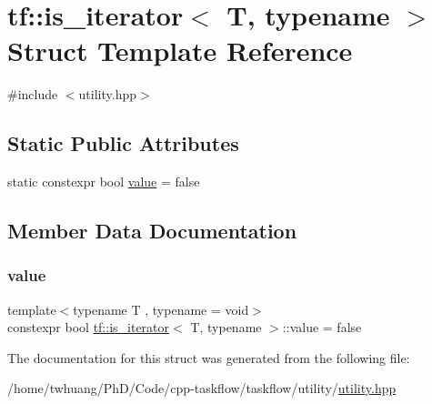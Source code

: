 \hypertarget{structtf_1_1is__iterator}{}\section{tf\+:\+:is\+\_\+iterator$<$ T, typename $>$ Struct Template Reference}
\label{structtf_1_1is__iterator}


{\ttfamily \#include $<$utility.\+hpp$>$}

\subsection*{Static Public Attributes}
\begin{DoxyCompactItemize}
\item 
static constexpr bool \hyperlink{structtf_1_1is__iterator_a5ba3fa7030b45a59913b999a8c1b8419}{value} = false
\end{DoxyCompactItemize}


\subsection{Member Data Documentation}
\mbox{\label{structtf_1_1is__iterator_a5ba3fa7030b45a59913b999a8c1b8419}} 
\subsubsection{\texorpdfstring{value}{value}}
{\footnotesize\ttfamily template$<$typename T , typename  = void$>$ \\
constexpr bool \hyperlink{structtf_1_1is__iterator}{tf\+::is\+\_\+iterator}$<$ T, typename $>$\+::value = false\hspace{0.3cm}{\ttfamily [static]}}



The documentation for this struct was generated from the following file\+:\begin{DoxyCompactItemize}
\item 
/home/twhuang/\+Ph\+D/\+Code/cpp-\/taskflow/taskflow/utility/\hyperlink{utility_8hpp}{utility.\+hpp}\end{DoxyCompactItemize}
